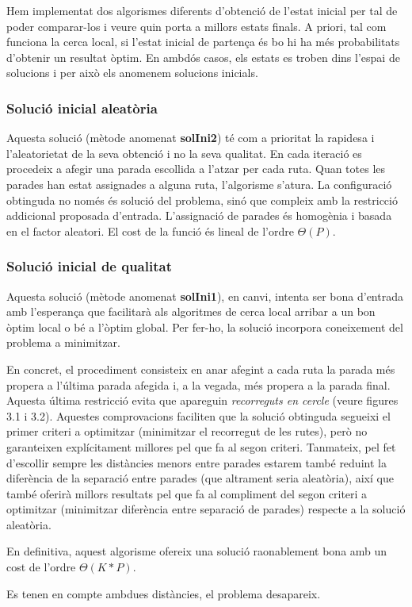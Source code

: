 
Hem implementat dos algorismes diferents d'obtenció de l'estat inicial per tal de poder comparar-los i veure quin porta a millors estats finals. A priori, tal com funciona la cerca local, si l'estat inicial de partença és bo hi ha més probabilitats d'obtenir un resultat òptim.  En ambdós casos, els estats es troben dins l'espai de solucions i per això els anomenem solucions inicials.

\subsubsection{Solució inicial aleatòria}

Aquesta solució (mètode anomenat \textbf{solIni2}) té com a prioritat la rapidesa i l'aleatorietat de la seva obtenció i no la seva qualitat. En cada iteració es procedeix a afegir una parada escollida a l'atzar per cada ruta. Quan totes les parades han estat assignades a alguna ruta, l'algorisme s'atura. La configuració obtinguda no només és solució del problema, sinó que compleix amb la restricció addicional proposada d'entrada. L'assignació de parades és homogènia i basada en el factor aleatori. El cost de la funció és lineal de l'ordre $\Theta(P)$.

\subsubsection{Solució inicial de qualitat}

Aquesta solució (mètode anomenat \textbf{solIni1}), en canvi, intenta ser bona d'entrada amb l'esperança que facilitarà als algoritmes de cerca local arribar a un bon òptim local o bé a l'òptim global. Per fer-ho, la solució incorpora coneixement del problema a minimitzar. 

En concret, el procediment consisteix en anar afegint a cada ruta la parada més propera a l'última parada afegida i, a la vegada, més propera a la parada final. Aquesta última restricció evita que apareguin \emph{recorreguts en cercle} (veure figures 3.1 i 3.2). Aquestes comprovacions faciliten que la solució obtinguda segueixi el primer criteri a optimitzar (minimitzar el recorregut de les rutes), però no garanteixen explícitament millores pel que fa al segon criteri. Tanmateix, pel fet d'escollir sempre les distàncies menors entre parades estarem també reduint la diferència de la separació entre parades (que altrament seria aleatòria), així que també oferirà millors resultats pel que fa al compliment del segon criteri a optimitzar (minimitzar diferència entre separació de parades) respecte a la solució aleatòria.

En definitiva, aquest algorisme ofereix una solució raonablement bona amb un cost de l'ordre $\Theta(K * P)$.


 {Es tenen en compte ambdues distàncies, el problema desapareix.}
